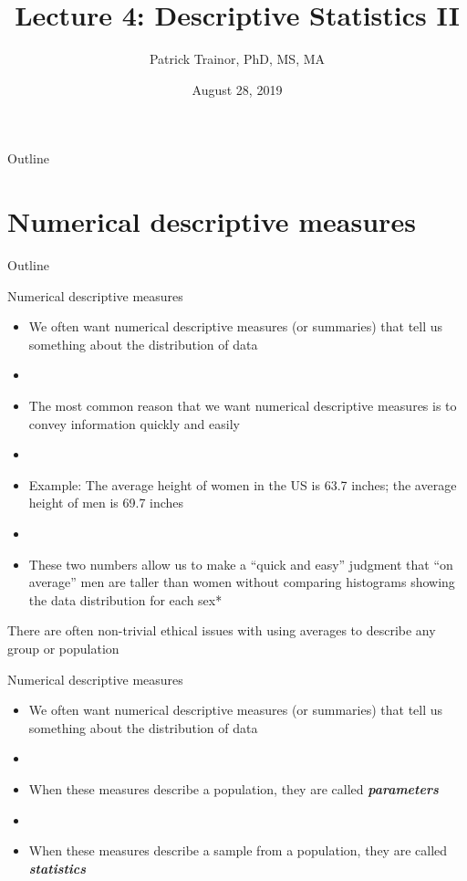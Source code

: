 \documentclass[xcolor=dvipsnames]{beamer}
\title[Lecture 4]{Lecture 4: Descriptive Statistics II}
\author[Patrick Trainor]{Patrick Trainor, PhD, MS, MA}
\institute[NMSU]{New Mexico State University}
\date{August 28, 2019}
\begin{document}
	
\begin{frame}
	\maketitle
\end{frame}

\begin{frame}{Outline}
	\tableofcontents[hideallsubsections]
\end{frame}

\section{Numerical descriptive measures}
\begin{frame}{Outline}
	\tableofcontents[currentsection,subsectionstyle=show/shaded/hide]
\end{frame}

\begin{frame}{Numerical descriptive measures}
	\begin{itemize}
		\item We often want numerical descriptive measures (or summaries) that tell us something about the distribution of data
		\item[]
		\item The most common reason that we want numerical descriptive measures is to convey information quickly and easily
		\item[]
		\item Example: The average height of women in the US is 63.7 inches; the average height of men is 69.7 inches
		\item[]
		\item These two numbers allow us to make a ``quick and easy'' judgment that ``on average'' men are taller than women without comparing histograms showing the data distribution for each sex*
	\end{itemize}
{\tiny *There are often non-trivial ethical issues with using averages to describe any group or population}
\end{frame}

\begin{frame}{Numerical descriptive measures}
	\begin{itemize}
		\item We often want numerical descriptive measures (or summaries) that tell us something about the distribution of data
		\item[]
		\item When these measures describe a population, they are called \textbf{\emph{parameters}}
		\item[]
		\item When these measures describe a sample from a population, they are called \textbf{\emph{statistics}}
	\end{itemize}
\end{frame}
\end{document}
